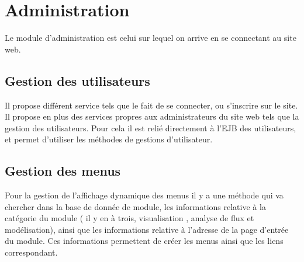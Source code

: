 \section{Administration}

Le module d'administration est celui sur lequel on arrive en se connectant au site web.

\subsection{Gestion des utilisateurs}
Il propose différent service tels que le fait de se connecter, ou s'inscrire sur le site. Il propose en plus des services propres aux administrateurs du site web tels que la gestion des utilisateurs. Pour cela il est relié directement à l'EJB des utilisateurs, et permet d'utiliser les méthodes de gestions d'utilisateur.\\

\subsection{Gestion des menus}
Pour la gestion de l'affichage dynamique des menus il y a une méthode qui va chercher dans la base de donnée de module, les informations relative à la catégorie du module ( il y en à trois, visualisation , analyse de flux et modélisation), ainsi que les informations relative à l'adresse de la page d'entrée du module. Ces informations permettent de créer les menus ainsi que les liens correspondant.\\

